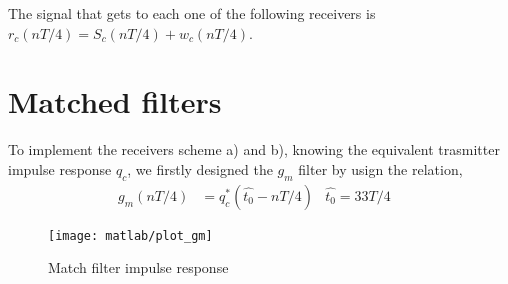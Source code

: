\documentclass[a4paper,oneside]{article}
\begin{document}
The signal that gets to each one of the following receivers is
$r_c(nT/4) = S_c(nT/4) + w_c(nT/4)$.

\section{Matched filters}
To implement the receivers scheme a) and b), knowing the equivalent trasmitter impulse response $q_c$, we firstly designed the $g_m$ filter by usign the relation, 
\begin{align}
  g_m(n T/4) &= q_c^* (\hat{t_0}-n T/4) & \hat{t_0} = 33 T/4&
\end{align}

\begin{figure}[htbp]
  \centering
  \texttt{[image: matlab/plot\_gm]}
  \caption{Match filter impulse response}
  \label{plot:gm}
\end{figure}
\newpage
\end{document}
